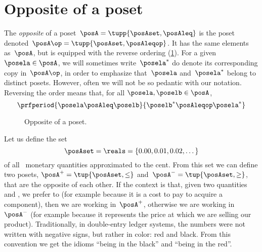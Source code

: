 
\section{Opposite of a poset}\label{sec:opposite-of-a-poset}

\begin{definition}
	\label{def:poset-opposite}
	The \emph{opposite} of a poset~$\posA=\tupp{\posAset, \posAleq}$ is the poset denoted~$\posA\op=\tupp{\posAset, \posAleqop}$.
	It has the same elements as~$\posA$, but is equipped with the reverse ordering (\cref{fig:poset-opposite}).
	For a given~$\posela \in \posA$, we will sometimes write~$\posela^*$ do denote its corresponding copy in~$\posA\op$, in order to emphasize that~$\posela$ and~$\posela^*$ belong to distinct posets.
	However, often we will not be so pedantic with our notation.
	Reversing the order means that, for all $\posela,\poselb \in \posA$,
	\begin{equation}
		\prfperiod{
			\posela \posAleq \poselb
		}{
			\poselb^* \posAleqop \posela^*
		}
	\end{equation}
\end{definition}

\begin{figure}[tbh]
	\centering
	\caption{
		Opposite of a poset.
	}
	\label{fig:poset-opposite}
\end{figure}

\begin{example}
	Let us define the set
	\begin{equation*}
		\posAset=\reals=\{0.00,0.01,0.02,\dots\}
	\end{equation*}
	of all \CHFneutral \ monetary quantities approximated to the cent.
	From this set we can define two posets, $\posA^{+} = \tup{\posAset, \leq}$ and~$\posA^{-} = \tup{\posAset, \geq}$, that are the opposite of each other.
	If the context is that, given two quantities~\unit[1]{\CHFneutral} and \unit[2]{\CHFneutral}, we prefer \unit[1]{\CHFneutral} to \unit[2]{\CHFneutral} (for example because it is a cost to pay to acquire a component), then we are working in~$\posA^{+}$, otherwise we are working in~$\posA^{-}$ (for example because it represents the price at which we are selling our product).
	Traditionally, in double-entry ledger systems, the numbers were not written with negative signs, but rather in color: red and black.
	From this convention we get the idioms ``being in the black'' and ``being in the red''.
\end{example}
